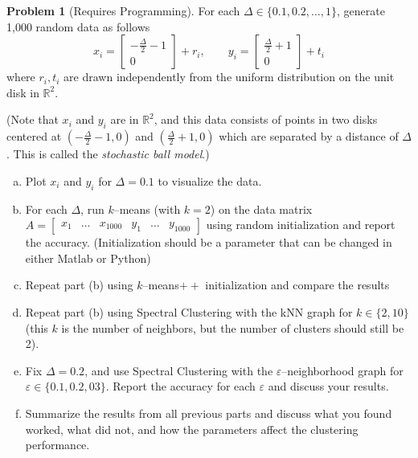 \documentclass{amsart}[11pt]
\theoremstyle{definition}
\newtheorem{problem}{Problem}
\newcommand{\R}{\mathbb{R}}
\newcommand{\eps}{\varepsilon}
\begin{document}
\begin{problem}[Requires Programming]
For each $\Delta\in\{0.1,0.2,\dots,1\}$, generate 1,000 random data as follows
\[x_i = \begin{bmatrix} -\frac{\Delta}{2}-1\\ 0 \end{bmatrix} + r_i,\qquad y_i = \begin{bmatrix} \frac{\Delta}{2} + 1\\ 0\end{bmatrix} + t_i\]
where $r_i,t_i$ are drawn independently from the uniform distribution on the unit disk in $\R^2$.

(Note that $x_i$ and $y_i$ are in $\R^2$, and this data consists of points in two disks centered at $(-\frac{\Delta}{2}-1,0)$ and $(\frac{\Delta}{2}+1,0)$ which are separated by a distance of $\Delta$.  This is called the \textit{stochastic ball model}.)

\begin{enumerate}[(a)]
\item Plot $x_i$ and $y_i$ for $\Delta=0.1$ to visualize the data.
\item For each $\Delta$, run $k$--means (with $k=2$) on the data matrix $A = \begin{bmatrix} x_1 & \dots & x_{1000} & y_1 & \dots & y_{1000}\end{bmatrix}$ using random initialization and report the accuracy. (Initialization should be a parameter that can be changed in either Matlab or Python)
\item Repeat part (b) using $k$--means$++$ initialization and compare the results
\item Repeat part (b) using Spectral Clustering with the kNN graph for $k\in\{2,10\}$ (this $k$ is the number of neighbors, but the number of clusters should still be 2).  
\item Fix $\Delta = 0.2$, and use Spectral Clustering with the $\eps$--neighborhood graph for $\eps\in\{0.1,0.2,03\}$.  Report the accuracy for each $\eps$ and discuss your results.
\item Summarize the results from all previous parts and discuss what you found worked, what did not, and how the parameters affect the clustering performance.
\end{enumerate}
\end{problem}
\end{document}

